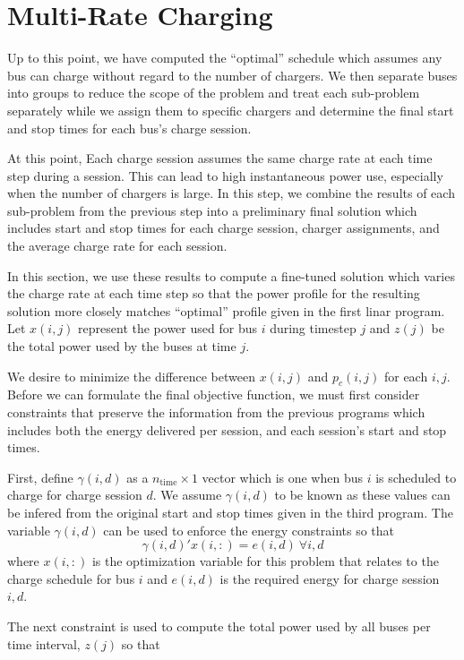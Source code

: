 \section{Multi-Rate Charging}
Up to this point, we have computed the ``optimal'' schedule which assumes any bus can charge without regard to the number of chargers. We then separate buses into groups to reduce the scope of the problem and treat each sub-problem separately while we assign them to specific chargers and determine the final start and stop times for each bus's charge session. \par At this point, Each charge session assumes the same charge rate at each time step during a session. This can lead to high instantaneous power use, especially when the number of chargers is large. In this step, we combine the results of each sub-problem from the previous step into a preliminary final solution which includes start and stop times for each charge session, charger assignments, and the average charge rate for each session. 
\par In this section, we use these results to compute a fine-tuned solution which varies the charge rate at each time step so that the power profile for the resulting solution more closely matches ``optimal'' profile given in the first linar program. Let $x(i,j)$ represent the power used for bus $i$ during timestep $j$ and $z(j)$ be the total power used by the buses at time $j$. 
\par We desire to minimize the difference between $x(i,j)$ and $p_c(i,j)$ for each $i,j$. Before we can formulate the final objective function, we must first consider constraints that preserve the information from the previous programs which includes both the energy delivered per session, and each session's start and stop times.
\par First, define $\gamma(i,d)$ as a $n_{\text{time}}\times 1$ vector which is one when bus $i$ is scheduled to charge for charge session $d$. We assume $\gamma(i,d)$ to be known as these values can be infered from the original start and stop times given in the third program.  The variable $\gamma(i,d)$ can be used to enforce the energy constraints so that
\begin{equation}
	\gamma(i,d)'x(i,:) = e(i,d) \ \forall i,d
\end{equation}
where $x(i,:)$ is the optimization variable for this problem that relates to the charge schedule for bus $i$ and $e(i,d)$ is the required energy for charge session $i,d$.
\par The next constraint is used to compute the total power used by all buses per time interval, $z(j)$ so that
